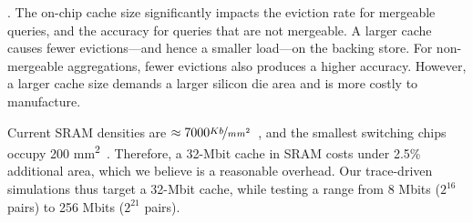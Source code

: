 .  The on-chip cache size significantly impacts the
eviction rate for mergeable queries, and the accuracy for queries that are not
mergeable. A larger cache causes fewer evictions---and hence a smaller load---on
the backing store. For non-mergeable aggregations, fewer evictions also produces
a higher accuracy. However, a larger cache size demands a larger silicon die
area and is more costly to manufacture.

Current SRAM densities are
$\approx7000\nicefrac{Kb}{mm^2}$~\cite{sram_estimate}, and the smallest
switching chips occupy 200 \si{\milli\metre\squared}~\cite{gibb_parsing}.
Therefore, a 32-Mbit cache in SRAM costs under 2.5\% additional area, which we believe is a reasonable overhead. Our trace-driven simulations thus target a 32-Mbit cache, while testing
a range from 8 Mbits ($2^{16}$ pairs) to 256 Mbits ($2^{21}$ pairs).

